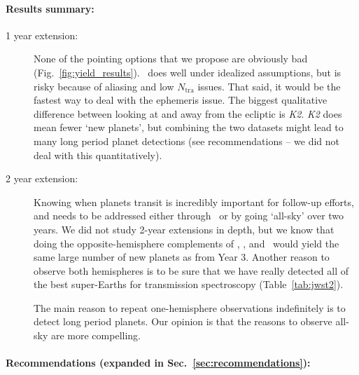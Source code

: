 \paragraph{Results summary:}
\begin{description}
	\item[1 year extension:]
	None of the pointing options that we propose are obviously bad (Fig.~\ref{fig:yield_results}).
	\hemis\ does well under idealized assumptions, but is risky because of aliasing and low $N_\mathrm{tra}$ issues. 
	That said, it would be the fastest way to deal with the ephemeris issue.
	The biggest qualitative difference between looking at and away from the ecliptic is \textit{K2}.
	\textit{K2} does mean fewer `new \tess planets', but combining the two datasets might lead to many long period planet detections (see recommendations -- we did not deal with this quantitatively).
	
	\item[2 year extension:]
	Knowing when \tess planets transit is incredibly important for follow-up efforts, and needs to be addressed either through \hemis\ or by going `all-sky' over two years.
	We did not study 2-year extensions in depth, but we know that doing the opposite-hemisphere complements of \nhemi, \npole, and \shemiAvoid\ would yield the same large number of new planets as from Year 3.
	Another reason to observe both hemispheres is to be sure that we have really detected all of the best super-Earths for transmission spectroscopy (Table~\ref{tab:jwst2}).
	
	The main reason to repeat one-hemisphere observations indefinitely is to detect long period planets.
	Our opinion is that the reasons to observe all-sky are more compelling.
	
\end{description}



\paragraph{Recommendations (expanded in Sec.~\ref{sec:recommendations}):}

